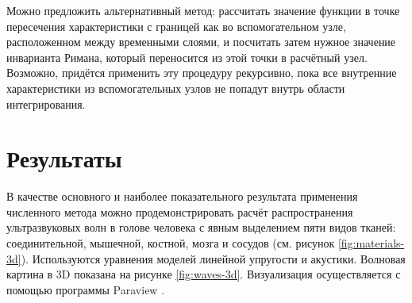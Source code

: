 \documentclass[a4paper]{article}
\numberwithin{equation}{section}
\begin{document}
Можно предложить альтернативный метод: рассчитать значение функции в точке пересечения 
характеристики с границей как во вспомогательном узле, 
расположенном между временными слоями, и посчитать затем нужное значение 
инварианта Римана, который переносится из этой точки в расчётный узел. 
Возможно, придётся применить эту процедуру рекурсивно, 
пока все внутренние характеристики из вспомогательных узлов не попадут внутрь 
области интегрирования. 


\section{Результаты}
В качестве основного и наиболее показательного результата применения численного метода можно 
продемонстрировать расчёт распространения ультразвуковых волн в голове человека 
с явным выделением пяти видов тканей: соединительной, мышечной, костной, мозга 
и сосудов (см. рисунок \ref{fig:materials-3d}). 
Используются уравнения моделей линейной упругости и акустики. 
Волновая картина в 3D показана на рисунке 
\ref{fig:waves-3d}. Визуализация осуществляется с помощью программы Paraview \cite{paraview}. 
\end{document}
